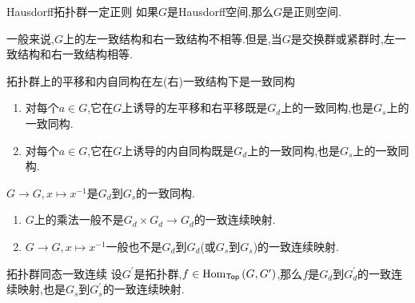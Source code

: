 \begin{corollary}{Hausdorff拓扑群一定正则}{}
	如果$G$是Hausdorff空间,那么$G$是正则空间.
\end{corollary}

\begin{remark}{}{}
	一般来说,$G$上的左一致结构和右一致结构不相等.但是,当$G$是交换群或紧群时,左一致结构和右一致结构相等.
\end{remark}

\begin{proposition}{拓扑群上的平移和内自同构在左(右)一致结构下是一致同构}{}
	\begin{enumerate}
		\item 对每个$a\in G$,它在$G$上诱导的左平移和右平移既是$G_{d}$上的一致同构,也是$G_{s}$上的一致同构.
		\item 对每个$a\in G$,它在$G$上诱导的内自同构既是$G_{d}$上的一致同构,也是$G_{s}$上的一致同构.
	\end{enumerate}
\end{proposition}

\begin{proposition}{}{}
	$G\to G,x\mapsto x^{-1}$是$G_{d}$到$G_{s}$的一致同构.
\end{proposition}

\begin{remark}{}{}
	\begin{enumerate}
		\item $G$上的乘法一般不是$G_{d}\times G_{d}\to G_{d}$的一致连续映射.
		\item $G\to G,x\mapsto x^{-1}$一般也不是$G_{d}$到$G_{d}$(或$G_{s}$到$G_{s}$)的一致连续映射.
	\end{enumerate}
\end{remark}

\begin{proposition}{拓扑群同态一致连续}{}
	设$G^{\prime}$是拓扑群,$f\in\operatorname{Hom}_{\mathsf{Top}}\left(G,G^{\prime}\right)$,那么$f$是$G_{d}$到$G_{d}^{\prime}$的一致连续映射,也是$G_{s}$到$G_{s}^{\prime}$的一致连续映射.
\end{proposition}

